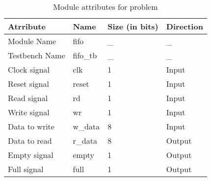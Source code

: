 \documentclass[a4paper,10pt]{article}
\theoremstyle{mytheor}
\newcounter{problemNumber}
\begin{document}
{    \begin{table}[!ht]
      \centering
      \caption{Module attributes for problem \theproblemNumber}
      \renewcommand{\arraystretch}{1.1}
      \begin{tabularx}{0.8\textwidth}{|X|X|X|X|}
        \hline \rowcolor{greatblue}
        \color{white} Atrribute & \color{white}Name & \color{white}Size (in bits) & \color{white}Direction\\
        \hline
        Module Name   & fifo            & \_  & \_        \\
        Testbench Name& fifo\_tb        & \_  & \_        \\ 
        Clock signal  & clk             &  1  & Input     \\
        Reset signal  & reset           &  1  & Input     \\
        Read signal   & rd              &  1  & Input     \\
        Write signal  & wr              &  1  & Input     \\
        Data to write & w\_data         &  8  & Input     \\
        Data to read  & r\_data         &  8  & Output    \\
        Empty signal  & empty           &  1  & Output    \\
        Full signal   & full            &  1  & Output    \\
        \hline
      \end{tabularx}
    \end{table}
}
 
\end{document}

